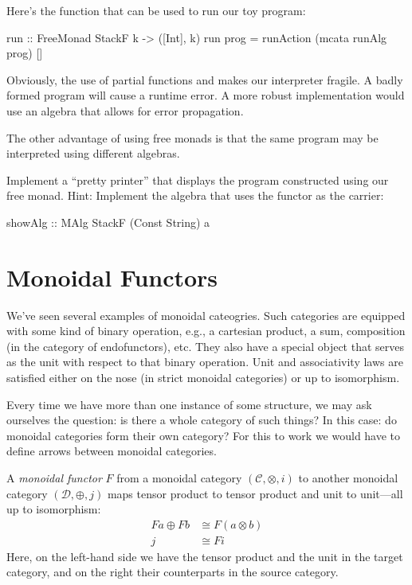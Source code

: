 \documentclass[DaoFP]{subfiles}
\begin{document}
Here's the function that can be used to run our toy program:
\begin{haskell}
run :: FreeMonad StackF k -> ([Int], k)
run prog = runAction (mcata runAlg prog) [] 
\end{haskell}

Obviously, the use of partial functions  and  makes our interpreter fragile. A badly formed program will cause a runtime error. A more robust implementation would use an algebra that allows for error propagation.

The other advantage of using free monads is that the same program may be interpreted using different algebras.

\begin{exercise}
Implement a ``pretty printer'' that displays the program constructed using our free monad. Hint: Implement the algebra that uses the  functor as the carrier:
\begin{haskell}
showAlg :: MAlg StackF (Const String) a
\end{haskell}
\end{exercise}

\section{Monoidal Functors}

We've seen several examples of monoidal cateogries. Such categories are equipped with some kind of binary operation, e.g., a cartesian product, a sum, composition (in the category of endofunctors), etc. They also have a special object that serves as the unit with respect to that binary operation. Unit and associativity laws are satisfied either on the nose (in strict monoidal categories) or up to isomorphism.

Every time we have more than one instance of some structure, we may ask ourselves the question: is there a whole category of such things? In this case: do monoidal categories form their own category? For this to work we would have to define arrows between monoidal categories.

A \emph{monoidal functor} $F$ from a monoidal category $(\mathcal{C}, \otimes, i)$ to another monoidal category $(\mathcal{D}, \oplus, j)$ maps tensor product to tensor product and unit to unit---all up to isomorphism:
\begin{align*}
F a \oplus F b &\cong F (a \otimes b) \\
j &\cong F i 
\end{align*}
Here, on the left-hand side we have the tensor product and the unit in the target category, and on the right their counterparts in the source category. 
\end{document}
